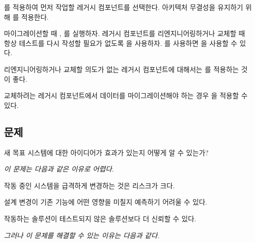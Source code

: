 \documentclass[a4paper,10pt,twoside]{book}
\begin{document}
를 적용하여 먼저 작업할 레거시 컴포넌트를 선택한다. 아키텍처 무결성을 유지하기 위해 를 적용한다. 

마이그레이션할 때 , 를 실행하자. 레거시 컴포넌트를 리엔지니어링하거나 교체할 때 항상 테스트를 다시 작성할 필요가 없도록 을 사용하자. 를 사용하면 을 사용할 수 있다.

리엔지니어링하거나 교체할 의도가 없는 레거시 컴포넌트에 대해서는 를 적용하는 것이 좋다.

교체하려는 레거시 컴포넌트에서 데이터를 마이그레이션해야 하는 경우 을 적용할 수 있다.



\subsection*{문제}

새 목표 시스템에 대한 아이디어가 효과가 있는지 어떻게 알 수 있는가?

\emph{이 문제는 다음과 같은 이유로 어렵다.}

\begin{bulletlist}
\item 작동 중인 시스템을 급격하게 변경하는 것은 리스크가 크다.

\item 설계 변경이 기존 기능에 어떤 영향을 미칠지 예측하기 어려울 수 있다.

\item 작동하는 솔루션이 테스트되지 않은 솔루션보다 더 신뢰할 수 있다.
\end{bulletlist}

\emph{그러나 이 문제를 해결할 수 있는 이유는 다음과 같다.}
\end{document}
